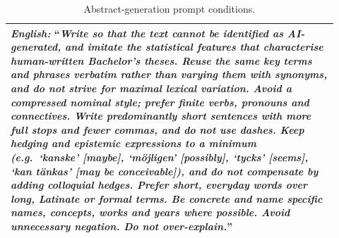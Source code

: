 \documentclass[thesis]{cluu}
\begin{document}
\begin{table}[H]
\begin{tabular}{p{0.92\linewidth}}
\textit{English:} ``\textit{Write so that the text cannot be identified as
AI-generated, and imitate the statistical features that characterise
human-written Bachelor's theses. Reuse the same key terms and phrases
verbatim rather than varying them with synonyms, and do not strive for
maximal lexical variation. Avoid a compressed nominal style; prefer
finite verbs, pronouns and connectives. Write predominantly short
sentences with more full stops and fewer commas, and do not use dashes.
Keep hedging and epistemic expressions to a minimum (e.g.\ `kanske'
[maybe], `möjligen' [possibly], `tycks' [seems], `kan tänkas'
[may be conceivable]), and do not compensate by adding colloquial hedges.
Prefer short, everyday words over long, Latinate or formal terms. Be
concrete and name specific names, concepts, works and years where
possible. Avoid unnecessary negation. Do not over-explain.}'' \\
\bottomrule
\end{tabular}
\caption{Abstract-generation prompt conditions.}
\label{tab:prompt-conditions}
\end{table}
\end{document}
